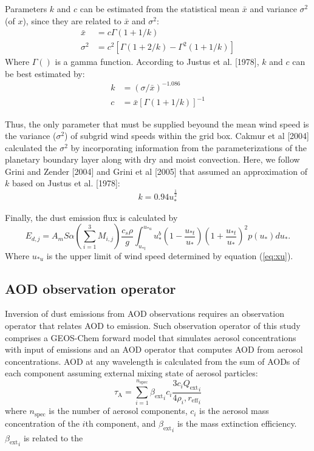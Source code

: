   Parameters $k$ and $c$ can be estimated from the statistical mean $\bar{x}$ and
  variance $\sigma^2$ (of $x$), since they are related to $\bar{x}$ and $\sigma^2$:
  \begin{align}
  \bar{x}  &= c \Gamma(1+1/k)  \\
  \sigma^2 &= c^2 \left[ \Gamma(1+2/k) - \Gamma^2(1+1/k) \right]  
  \end{align}
  Where $\Gamma()$ is a gamma function. According to Justus et al. [1978], $k$ and $c$
  can be best estimated by:
  \begin{align}
  k &= (\sigma/\bar{x})^{-1.086} \\
  c &= \bar{x} \left[ \Gamma(1+1/k) \right]^{-1}
  \end{align}

  Thus, the only parameter that must be supplied beyound the mean wind speed is the
  variance ($\sigma^2$) of subgrid wind speeds within the grid box. Cakmur et al [2004]
  calculated the $\sigma^2$ by incorporating information from the parameterizations of
  the planetary boundary layer along with dry and moist convection. Here, we follow
  Grini and Zender [2004] and Grini et al [2005] that assumed an approximation of $k$
  based on Justus et al. [1978]:
  \begin{equation}
  k = 0.94u_*^{\frac{1}{2}}
  \end{equation}

  Finally, the dust emission flux is calculated by
  \begin{equation} \label{eq:Edp}
  E_{d,j} = A_m S \alpha \left( \displaystyle{\sum_{i=1}^3 M_{i,j}} \right)
          \frac{c_s \rho}{g}
          \displaystyle \int_{u_{*t}}^{u_{*u}} 
          u_*^b\left(1-\frac{u_{*t}}{u_*}\right)
          \left(1+\frac{u_{*t}}{u_*}\right)^2 
          p(u_*) d u_* \mbox{.}
  \end{equation}
  Where $u_{*u}$ is the upper limit of wind speed determined by equation (\ref{eq:xu}).

 \subsection{AOD observation operator}

  Inversion of dust emissions from AOD observations requires
  an observation operator that relates AOD to emission.
  Such observation operator of this study comprises
  a GEOS-Chem forward model that simulates aerosol concentrations
  with input of emissions and an AOD operator that computes AOD
  from aerosol concentrations.
  AOD at any wavelength is calculated from the sum of AODs
  of each component assuming external mixing state of aerosol
  particles:
  \begin{equation} \label{eq:aod} 
   \tau_\text{A} = \displaystyle \sum_{i=1}^{n_\text{spec}} 
                   {\beta_\text{ext}}_i c_i
                   \frac{3c_i {Q_\text{ext}}_i}{4 \rho_i, {r_\text{eff}}_i}
  \end{equation}
  where $n_\text{spec}$ is the number of aerosol components,
  $c_i$ is the aerosol mass concentration of the $i$th component,
  and ${\beta_\text{ext}}_i$ is the mass extinction efficiency.
  ${\beta_\text{ext}}_i$ is related to the

